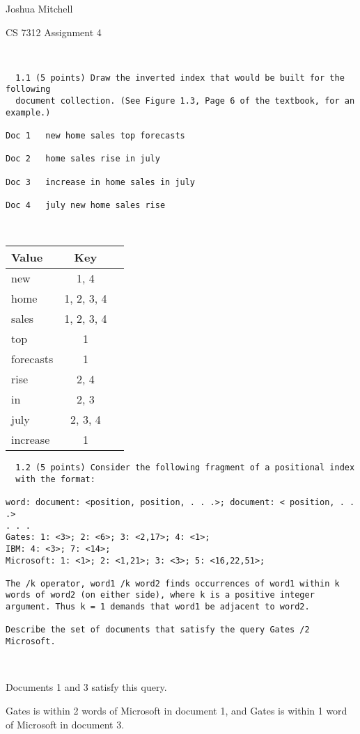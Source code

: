 \documentclass[12pt]{article}
\begin{document}
Joshua Mitchell

CS 7312 Assignment 4

\

\begin{verbatim}
  1.1 (5 points) Draw the inverted index that would be built for the following
  document collection. (See Figure 1.3, Page 6 of the textbook, for an example.)

Doc 1 	new home sales top forecasts

Doc 2 	home sales rise in july

Doc 3 	increase in home sales in july

Doc 4 	july new home sales rise
\end{verbatim}


\

\begin{tabular}{l|cc}
  Value & Key& \\
  \hline
  new & 1, 4& \\
  home & 1, 2, 3, 4 & \\
  sales & 1, 2, 3, 4 & \\
  top & 1 & \\
  forecasts & 1 & \\
  rise & 2, 4 & \\
  in & 2, 3 & \\
  july & 2, 3, 4 & \\
  increase & 1 &
\end{tabular}

\begin{verbatim}
  1.2 (5 points) Consider the following fragment of a positional index
  with the format: 

word: document: <position, position, . . .>; document: < position, . . .> 
. . .
Gates: 1: <3>; 2: <6>; 3: <2,17>; 4: <1>;
IBM: 4: <3>; 7: <14>;
Microsoft: 1: <1>; 2: <1,21>; 3: <3>; 5: <16,22,51>;

The /k operator, word1 /k word2 finds occurrences of word1 within k words of word2 (on either side), where k is a positive integer argument. Thus k = 1 demands that word1 be adjacent to word2.

Describe the set of documents that satisfy the query Gates /2 Microsoft.
\end{verbatim}

\

Documents 1 and 3 satisfy this query.

Gates is within 2 words of Microsoft in document 1, and Gates is within 1 word of Microsoft in document 3.
\end{document}
